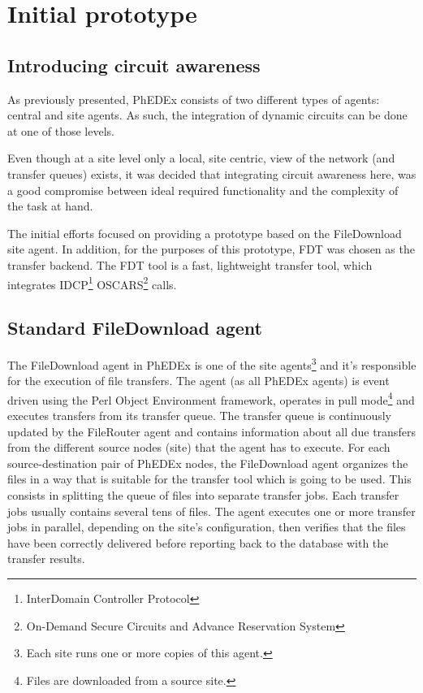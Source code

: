 \section{Initial prototype}

\subsection{Introducing circuit awareness}

As previously presented, PhEDEx consists of two different types of agents: 
central and site agents. As such, the integration of dynamic circuits can 
be done at one of those levels.

Even though at a site level only a local, site centric, view of
the network (and transfer queues) exists, it was decided that integrating 
circuit awareness here, was a good compromise between ideal required 
functionality and the complexity of the task at hand.

The initial efforts focused on providing a prototype based on the FileDownload
site agent. In addition, for the purposes of this prototype, FDT was chosen
as the transfer backend. The FDT tool is a fast, lightweight transfer tool,
which integrates IDCP\footnote{InterDomain Controller Protocol} 
OSCARS\footnote{On-Demand Secure Circuits and Advance Reservation System} calls.

\subsection{Standard FileDownload agent}

The FileDownload agent in PhEDEx is one of the site agents\footnote{
Each site runs one or more copies of this agent.} and it's responsible for the
execution of file transfers. The agent (as all PhEDEx agents) is event driven 
using the Perl Object Environment framework, operates in pull mode\footnote{Files are
downloaded from a source site.} and executes transfers from its transfer queue.
The transfer queue is continuously updated by the FileRouter agent and contains 
information about all due transfers from the different source nodes (site) that the agent 
has to execute. For each source-destination pair of PhEDEx nodes, the FileDownload 
agent organizes the files in a way that is suitable for the transfer tool which is 
going to be used. This consists in splitting the queue of files into separate 
transfer jobs. Each transfer jobs usually contains several tens of files.
The agent executes one or more transfer jobs in parallel, depending 
on the site's configuration, then verifies that the files have been correctly 
delivered before reporting back to the database with the transfer results.

